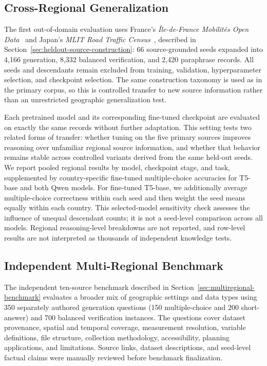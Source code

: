 \documentclass[a4paper,fleqn]{cas-sc}
\begin{document}
\subsection{Cross-Regional Generalization}

The first out-of-domain evaluation uses France's \textit{Île-de-France Mobilités Open Data}~\cite{idfm2024} and Japan's \textit{MLIT Road Traffic Census}~\cite{mlit2024}, described in Section~\ref{sec:heldout-source-construction}: 66 source-grounded seeds expanded into 4,166 generation, 8,332 balanced verification, and 2,420 paraphrase records. All seeds and descendants remain excluded from training, validation, hyperparameter selection, and checkpoint selection. The same construction taxonomy is used as in the primary corpus, so this is controlled transfer to new source information rather than an unrestricted geographic generalization test.

Each pretrained model and its corresponding fine-tuned checkpoint are evaluated on exactly the same records without further adaptation. This setting tests two related forms of transfer: whether tuning on the five primary sources improves reasoning over unfamiliar regional source information, and whether that behavior remains stable across controlled variants derived from the same held-out seeds. We report pooled regional results by model, checkpoint stage, and task, supplemented by country-specific fine-tuned multiple-choice accuracies for T5-base and both Qwen models. For fine-tuned T5-base, we additionally average multiple-choice correctness within each seed and then weight the seed means equally within each country. This selected-model sensitivity check assesses the influence of unequal descendant counts; it is not a seed-level comparison across all models. Regional reasoning-level breakdowns are not reported, and row-level results are not interpreted as thousands of independent knowledge tests.

\subsection{Independent Multi-Regional Benchmark}

The independent ten-source benchmark described in Section~\ref{sec:multiregional-benchmark} evaluates a broader mix of geographic settings and data types using 350 separately authored generation questions (150 multiple-choice and 200 short-answer) and 700 balanced verification instances. The questions cover dataset provenance, spatial and temporal coverage, measurement resolution, variable definitions, file structure, collection methodology, accessibility, planning applications, and limitations. Source links, dataset descriptions, and seed-level factual claims were manually reviewed before benchmark finalization.
\end{document}
